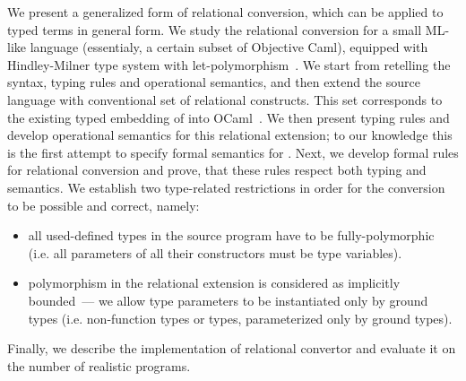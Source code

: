 We present a generalized form of relational conversion, which can be applied to typed terms in general form. We study the relational conversion 
for a small ML-like language (essentialy, a certain subset of Objective Caml), equipped with Hindley-Milner type system with let-polymorphism~\cite{Types}. 
We start from retelling the syntax, typing rules and operational semantics, and then extend the source language with conventional set of 
relational constructs. This set corresponds to the existing typed embedding of \miniKanren into OCaml~\cite{ocanren}. We then present typing rules and 
develop operational semantics for this relational extension; to our knowledge this is the first attempt to specify formal semantics for
\miniKanren. Next, we develop formal rules for relational conversion and prove, that these rules respect both typing and
semantics. We establish two type-related restrictions in order for the conversion to be possible and correct, namely:

\begin{itemize}
\item all used-defined types in the source program have to be fully-polymorphic (i.e. all parameters of all their constructors must be type variables).
\item polymorphism in the relational extension is considered as implicitly bounded~--- we allow type parameters to be instantiated only
by ground types (i.e. non-function types or types, parameterized only by ground types).
\end{itemize}

Finally, we describe the implementation of relational convertor and evaluate it on the number of realistic programs.
